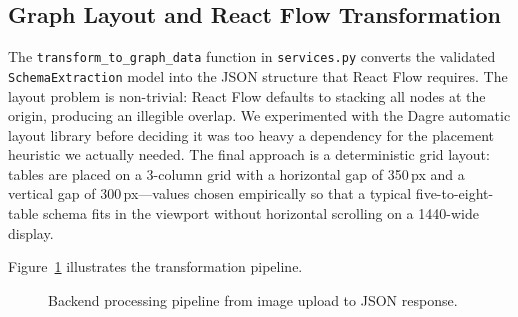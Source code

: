\documentclass[conference]{IEEEtran}
\begin{document}
\subsection{Graph Layout and React Flow Transformation}

The \texttt{transform\_to\_graph\_data} function in
\texttt{services.py} converts the validated \texttt{SchemaExtraction}
model into the JSON structure that React Flow requires. The layout
problem is non-trivial: React Flow defaults to stacking all nodes at
the origin, producing an illegible overlap. We experimented with
the Dagre automatic layout library before deciding it was too heavy
a dependency for the placement heuristic we actually needed. The
final approach is a deterministic grid layout: tables are placed
on a 3-column grid with a horizontal gap of 350\,px and a vertical
gap of 300\,px---values chosen empirically so that a typical
five-to-eight-table schema fits in the viewport without horizontal
scrolling on a 1440-wide display.

Figure~\ref{fig:flow} illustrates the transformation pipeline.

\begin{figure}[htbp]
\centering
{}
\caption{Backend processing pipeline from image upload to JSON response.}
\label{fig:flow}
\end{figure}
\end{document}
